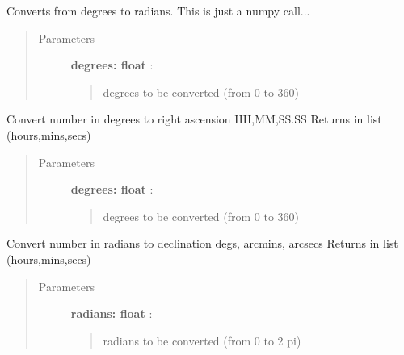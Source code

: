 \documentclass[letterpaper,10pt,english]{sphinxmanual}
\begin{document}
\begin{fulllineitems}
\label{index:astroCoords.deg2rad}
Converts from degrees to radians.
This is just a numpy call...
\begin{quote}\begin{description}
\item[{Parameters }] \leavevmode
\textbf{degrees: float} :
\begin{quote}

degrees to be converted (from 0 to 360)
\end{quote}

\end{description}\end{quote}

\end{fulllineitems}



\begin{fulllineitems}
\label{index:astroCoords.deg2rahms}
Convert number in degrees to right ascension HH,MM,SS.SS
Returns in list (hours,mins,secs)
\begin{quote}\begin{description}
\item[{Parameters }] \leavevmode
\textbf{degrees: float} :
\begin{quote}

degrees to be converted (from 0 to 360)
\end{quote}

\end{description}\end{quote}

\end{fulllineitems}



\begin{fulllineitems}
\label{index:astroCoords.rad2decdms}
Convert number in radians to declination degs, arcmins, arcsecs
Returns in list (hours,mins,secs)
\begin{quote}\begin{description}
\item[{Parameters }] \leavevmode
\textbf{radians: float} :
\begin{quote}

radians to be converted (from 0 to 2 pi)
\end{quote}

\end{description}\end{quote}

\end{fulllineitems}
\end{document}
